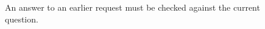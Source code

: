\begin{figure}[H]
\centering
{}
\caption{An answer to an earlier request must be checked against the current question.}\label{fig:teach-M06-17}
\end{figure}
